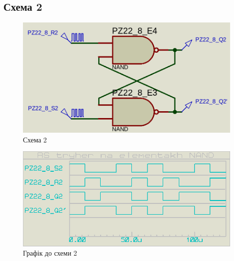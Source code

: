 \documentclass{article}
\begin{document}
\begin{normalsize}
	\section*{Схема 2}	
	\begin{figure}[H]
		\centering
		\includegraphics[scale=0.25]{s2}	
		\caption{Схема 2}
	\end{figure}
	
	\begin{figure}[H]
		\centering
		\includegraphics[scale=0.25]{g2}	
		\caption{Графік до схеми 2}
	\end{figure}


\end{normalsize}
\end{document}
